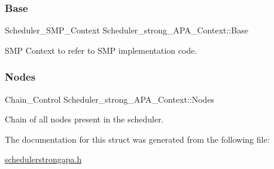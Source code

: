 \subsubsection{\texorpdfstring{Base}{Base}}
{\footnotesize\ttfamily Scheduler\+\_\+\+S\+M\+P\+\_\+\+Context Scheduler\+\_\+strong\+\_\+\+A\+P\+A\+\_\+\+Context\+::\+Base}



S\+MP Context to refer to S\+MP implementation code. 

\mbox{\label{structScheduler__strong__APA__Context_a07cebd5016654b5c7d05ec9982449d4d}} 
\subsubsection{\texorpdfstring{Nodes}{Nodes}}
{\footnotesize\ttfamily Chain\+\_\+\+Control Scheduler\+\_\+strong\+\_\+\+A\+P\+A\+\_\+\+Context\+::\+Nodes}



Chain of all nodes present in the scheduler. 



The documentation for this struct was generated from the following file\+:\begin{DoxyCompactItemize}
\item 
\hyperlink{schedulerstrongapa_8h}{schedulerstrongapa.\+h}\end{DoxyCompactItemize}
